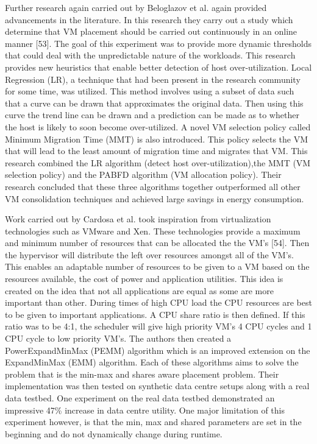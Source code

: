 \documentclass[oneside,12pt]{Classes/RoboticsLaTeX}
\begin{document}
Further research again carried out by Beloglazov et al. again provided advancements in the literature. In this research they carry out a study which determine that VM placement should be carried out continuously in an online manner [53]. The goal of this experiment was to provide more dynamic thresholds that could deal with the unpredictable nature of the workloads. This research provides new heuristics that enable better detection of host over-utilization. Local Regression (LR), a technique that had been present in the research community for some time, was utilized. This method involves using a subset of data such that a curve can be drawn that approximates the original data. Then using this curve the trend line can be drawn and a prediction can be made as to whether the host is likely to soon become over-utilized. A novel VM selection policy called Minimum Migration Time (MMT) is also introduced. This policy selects the VM that will lead to the least amount of migration time and migrates that VM. This research combined the LR algorithm (detect host over-utilization),the MMT (VM selection policy) and the PABFD algorithm (VM allocation policy). Their research concluded that these three algorithms together outperformed all other VM consolidation techniques and achieved large savings in energy consumption. 

Work carried out by Cardosa et al. took inspiration from virtualization technologies such as VMware and Xen. These technologies provide a maximum and minimum number of resources that can be allocated the the VM's [54]. Then the hypervisor will distribute the left over resources amongst all of the VM's. This enables an adaptable number of resources to be given to a VM based on the resources available, the cost of power and application utilities. This idea is created on the idea that not all applications are equal as some are more important than other. During times of high CPU load the CPU resources are best to be given to important applications. A CPU share ratio is then defined. If this ratio was to be 4:1, the scheduler will give high priority VM's 4 CPU cycles and 1 CPU cycle to low priority VM's. The authors then created a PowerExpandMinMax (PEMM) algorithm which is an improved extension on the ExpandMinMax (EMM) algorithm. Each of these algorithms aims to solve the problem that is the min-max and shares aware placement problem. Their implementation was then tested on synthetic data centre setups along with a real data testbed. One experiment on the real data testbed demonstrated an impressive 47\% increase in data centre utility. One major limitation of this experiment however, is that the min, max and shared parameters are set in the beginning and do not dynamically change during runtime. 
\end{document}
